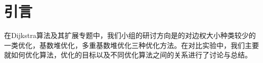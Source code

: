 \chapter{引言}
在Dijkstra算法及其扩展专题中，我们小组的研讨方向是的对边权大小种类较少的一类优化，基数堆优化，多重基数堆优化三种优化方法。在对比实验中，我们主要就如何优化算法，优化的目标以及不同优化算法之间的关系进行了讨论与总结。
